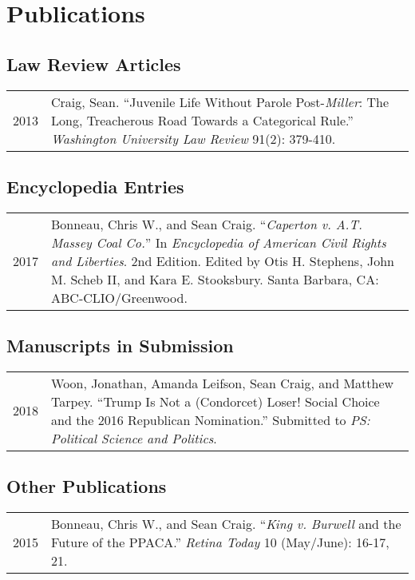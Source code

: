 \documentclass[12pt,letterpaper]{article}
\begin{document}
\section*{\sf Publications}

\subsection*{\sf Law Review Articles}
\begin{tabularx}{\textwidth}{@{}DX@{}}
  2013 & Craig, Sean. %
    ``Juvenile Life Without Parole Post-{\em Miller}: %
    The Long, Treacherous Road Towards a Categorical Rule.'' %
    {\em Washington University Law Review} 91(2): 379-410. \par\bigskip \\
\end{tabularx}
\subsection*{\sf Encyclopedia Entries}
\begin{tabularx}{\textwidth}{@{}DX@{}}
  2017 & Bonneau, Chris W., and Sean Craig. %
  ``{\em Caperton v. A.T. Massey Coal Co.}'' %
  In {\em Encyclopedia of American Civil Rights and Liberties}. 2nd Edition. %
  Edited by Otis H. Stephens, John M. Scheb II, and Kara E. Stooksbury. %
  Santa Barbara, CA: ABC-CLIO/Greenwood. \par\bigskip \\
\end{tabularx}
\subsection*{\sf Manuscripts in Submission}
\begin{tabularx}{\textwidth}{@{}DX@{}}
  2018 & Woon, Jonathan, Amanda Leifson, Sean Craig, and Matthew Tarpey. %
    ``Trump Is Not a (Condorcet) Loser! Social Choice and the 2016 Republican Nomination.'' %
    Submitted to {\em PS: Political Science and Politics}. \bigskip \\
\end{tabularx} \par\bigskip
\subsection*{\sf Other Publications}
\begin{tabularx}{\textwidth}{@{}DX@{}}
  2015 & Bonneau, Chris W., and Sean Craig. %
    ``{\em King v. Burwell} and the Future of the PPACA.'' %
    {\em Retina Today} 10 (May/June): 16-17, 21. \bigskip \\
\end{tabularx} \par\bigskip
\end{document}
